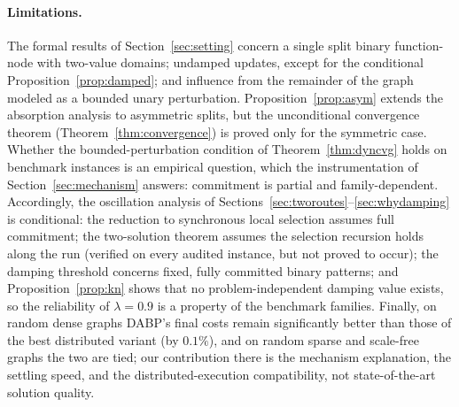 \paragraph{Limitations.}
The formal results of Section~\ref{sec:setting} concern a single split binary
function-node with two-value domains; undamped updates, except for the
conditional Proposition~\ref{prop:damped}; and influence from the remainder of
the graph modeled as a bounded unary perturbation.
Proposition~\ref{prop:asym} extends the absorption analysis to asymmetric
splits, but the unconditional convergence theorem
(Theorem~\ref{thm:convergence}) is proved only for the symmetric case.
Whether the bounded-perturbation condition of Theorem~\ref{thm:dyncvg} holds
on benchmark instances is an empirical question, which the instrumentation of
Section~\ref{sec:mechanism} answers: commitment is partial and
family-dependent.  Accordingly, the oscillation analysis of
Sections~\ref{sec:tworoutes}--\ref{sec:whydamping} is conditional: the
reduction to synchronous local selection assumes full commitment; the
two-solution theorem assumes the selection recursion holds along the run
(verified on every audited instance, but not proved to occur); the damping
threshold concerns fixed, fully committed binary patterns; and
Proposition~\ref{prop:kn} shows that no problem-independent damping value
exists, so the reliability of $\lambda = 0.9$ is a property of the
benchmark families.  Finally, on random dense graphs
DABP's final costs remain significantly better than those of the best
distributed variant (by $0.1\%$), and on random sparse and scale-free graphs
the two are tied; our contribution there is the mechanism
explanation, the settling speed, and the distributed-execution
compatibility, not state-of-the-art solution quality.
